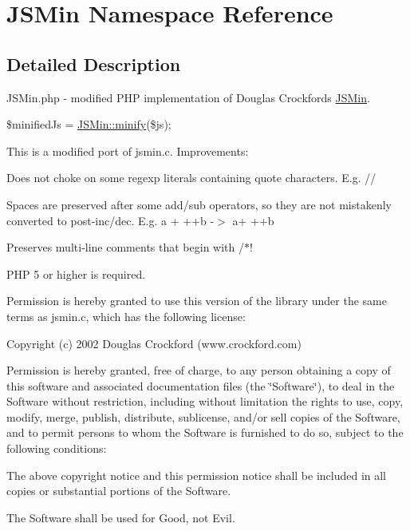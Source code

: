 \hypertarget{namespaceJSMin}{}\section{J\+S\+Min Namespace Reference}
\label{namespaceJSMin}


\subsection{Detailed Description}
J\+S\+Min.\+php -\/ modified P\+H\+P implementation of Douglas Crockford\textquotesingle{}s \hyperlink{classJSMin}{J\+S\+Min}.

{\ttfamily  \$minified\+Js = \hyperlink{classJSMin_a524912007600454e4396aea890384ab6}{J\+S\+Min\+::minify}(\$js); }

This is a modified port of jsmin.\+c. Improvements\+:

Does not choke on some regexp literals containing quote characters. E.\+g. /\textquotesingle{}/

Spaces are preserved after some add/sub operators, so they are not mistakenly converted to post-\/inc/dec. E.\+g. a + ++b -\/$>$ a+ ++b

Preserves multi-\/line comments that begin with /$\ast$!

P\+H\+P 5 or higher is required.

Permission is hereby granted to use this version of the library under the same terms as jsmin.\+c, which has the following license\+: 

 Copyright (c) 2002 Douglas Crockford (www.\+crockford.\+com)

Permission is hereby granted, free of charge, to any person obtaining a copy of this software and associated documentation files (the \char`\"{}\+Software\char`\"{}), to deal in the Software without restriction, including without limitation the rights to use, copy, modify, merge, publish, distribute, sublicense, and/or sell copies of the Software, and to permit persons to whom the Software is furnished to do so, subject to the following conditions\+:

The above copyright notice and this permission notice shall be included in all copies or substantial portions of the Software.

The Software shall be used for Good, not Evil.

